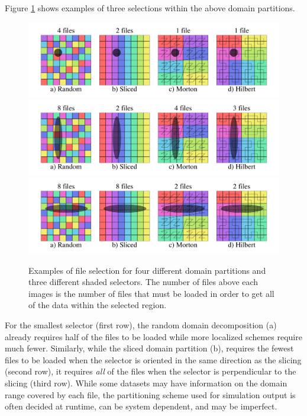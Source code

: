 \documentclass[apjl]{emulateapj}
\begin{document}
Figure \ref{fig:selectors} shows examples of three selections within the above domain partitions. 
%
\ifinclfig
	\begin{figure}[htbp]
	\begin{center}
	\includegraphics[width=\columnwidth,keepaspectratio]{../images/selector1.png}
	\includegraphics[width=\columnwidth,keepaspectratio]{../images/selector5.png}
	\includegraphics[width=\columnwidth,keepaspectratio]{../images/selector4.png}
	\caption{Examples of file selection for four different domain partitions and three different shaded 	selectors. The number of files above each images is the number of files that must be loaded in order to get all of the data within the selected region.}
	\label{fig:selectors}
	\end{center}
	\end{figure}
\fi
%
For the smallest selector (first row), the random domain decomposition (a) already requires half of the files to be loaded while more localized schemes require much fewer. Similarly, while the sliced domain partition (b), requires the fewest files to be loaded when the selector is oriented in the same direction as the slicing (second row), it requires \textit{all} of the files when the selector is perpendicular to the slicing (third row). While some datasets may have information on the domain range covered by each file, the partitioning scheme used for simulation output is often decided at runtime, can be system dependent, and may be imperfect. 
\end{document}
